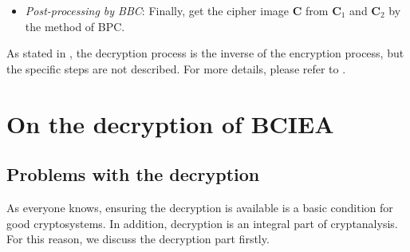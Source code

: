 \documentclass[final,3p,times,twocolumn]{elsarticle}
\begin{document}
\begin{itemize}
	\item \emph{Post-processing by BBC}:
	Finally, get the cipher image $\bm{C}$ from $\bm{C}_1$ and $\bm{C}_2$ by the method of BPC.
\end{itemize}
As stated in \cite{LuX2016OLE}, the decryption process is the inverse of the encryption process, but the specific steps are not described. For more details, please refer to \cite{LuX2016OLE}. 

\section{On the decryption of BCIEA}
\label{sec3:decryption}

\subsection{Problems with the decryption}

As everyone knows, ensuring the decryption is available is a basic condition for good cryptosystems. In addition, decryption is an integral part of cryptanalysis. For this reason, we discuss the decryption part firstly.
\end{document}
